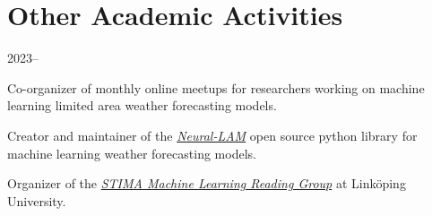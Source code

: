 \section*{Other Academic Activities}
\begin{labeling}{2023--}
    \item [2023--] Co-organizer of monthly online meetups for researchers working on machine learning limited area weather forecasting models. %
    \item [2023--] Creator and maintainer of the \href{https://github.com/mllam/neural-lam}{\textit{Neural-LAM}} open source python library for machine learning weather forecasting models.
    \item [2022--] Organizer of the \href{https://github.com/STIMALiU/ml-reading-group}{\textit{STIMA Machine Learning Reading Group}} at Linköping University.
\end{labeling}
